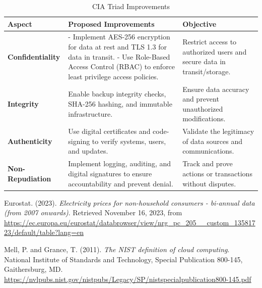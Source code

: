 \documentclass{llncs}
\begin{document}
\begin{table}[tbph]
  \centering
  \begin{tabular}{|p{3cm}|p{5cm}|p{5cm}|}
    \hline
    \textbf{Aspect} & \textbf{Proposed Improvements}                                                                     & \textbf{Objective} \\ \hline
    \textbf{Confidentiality}
                    & - Implement AES-256 encryption for data at rest and TLS 1.3 for data in transit. \newline
    - Use Role-Based Access Control (RBAC) to enforce least privilege access policies. 
                    & Restrict access to authorized users and secure data in transit/storage.                                                 \\ \hline
    \textbf{Integrity}
                    & Enable backup integrity checks, SHA-256 hashing, and immutable infrastructure. 
                    & Ensure data accuracy and prevent unauthorized modifications.                                                            \\ \hline
    \textbf{Authenticity}
                    & Use digital certificates and code-signing to verify systems, users, and updates. 
                    & Validate the legitimacy of data sources and communications.                                                             \\ \hline
    \textbf{Non-Repudiation}
                    & Implement logging, auditing, and digital signatures to ensure accountability and prevent denial. 
                    & Track and prove actions or transactions without disputes.                                                               \\ \hline
  \end{tabular}
  \caption{CIA Triad Improvements}
  \label{tab:cia-triad}
\end{table}


\begin{thebibliography}{5}
  
  Eurostat. (2023). \textit{Electricity prices for non-household consumers - bi-annual data (from 2007 onwards)}. Retrieved November 16, 2023, from \url{https://ec.europa.eu/eurostat/databrowser/view/nrg_pc_205__custom_13581723/default/table?lang=en}
  
  Mell, P. and Grance, T. (2011).
  \emph{The NIST definition of cloud computing}.
  National Institute of Standards and Technology, Special Publication 800-145, Gaithersburg, MD.
  \url{https://nvlpubs.nist.gov/nistpubs/Legacy/SP/nistspecialpublication800-145.pdf}
  
\end{thebibliography}
\end{document}
